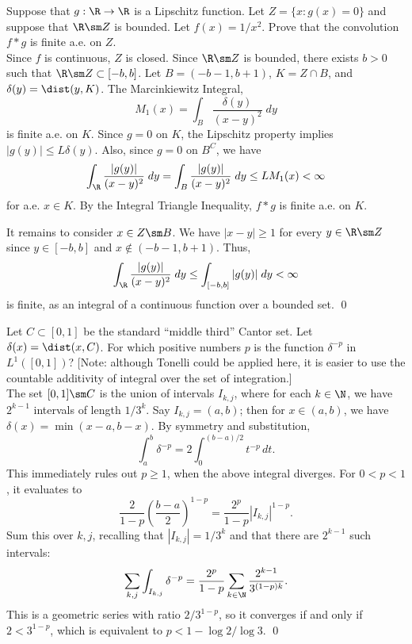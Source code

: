 \begin{hwsol}
Suppose that $g: \R \to \R$ is a Lipschitz function. Let $Z= \{ x \colon g(x)= 0 \}$ and suppose that $\R \sm Z$ is bounded. Let $f(x)=1/x^2$. Prove that the convolution $f*g$ is finite a.e. on $Z$. \\

\pf Since $f$ is continuous, $Z$ is closed. Since $\R \sm Z$ is bounded, there exists $b > 0$ such that $\R \sm Z \subset [-b, b]$. Let $B= (-b-1,b+1)$, $K= Z \cap B$, and $\delta(y)= \dist(y, K)$. The Marcinkiewitz Integral,
        \[
        M_1(x)= \int_B \dfrac{\delta(y)}{(x-y)^2} \;dy
        \]
is finite a.e. on $K$. Since $g=0$ on $K$, the Lipschitz property implies $|g(y)|\leq L\delta(y)$. Also, since $g=0$ on $B^C$, we have 
        \[
        \int_{\R} \dfrac{|g(y)|}{(x-y)^2} \;dy= \int_{B} \dfrac{|g(y)|}{(x-y)^2} \;dy \leq L M_1(x) < \infty
        \]
for a.e. $x \in K$. By the Integral Triangle Inequality, $f*g$ is finite a.e. on $K$. 

It remains to consider $x \in Z \sm B$. We have $|x - y| \geq 1$ for every $y \in \R \sm Z$ since $y \in [-b, b]$ and $x \notin (-b-1,b+1)$. Thus, 
        \[
        \int_{\R} \dfrac{|g(y)|}{(x-y)^2} \;dy \leq \int_{[-b, b]} |g(y)| \;dy < \infty
        \]
is finite, as an integral of a continuous function over a bounded set. \qed \\
\end{hwsol}


\begin{hwsol}
Let $C \subset [0, 1]$ be the standard ``middle third'' Cantor set. Let $\delta(x)= \dist(x,C)$. For which positive numbers $p$ is the function $\delta^{-p}$ in $L^1([0, 1])$? [Note: although Tonelli could be applied here, it is easier to use the countable additivity of integral over the set of integration.] \\

\pf The set $[0, 1] \sm C$ is the union of intervals $I_{k,j}$, where for each $k \in \N$, we have $2^{k-1}$ intervals of length $1/3^k$. Say $I_{k, j} = (a, b)$; then for $x \in (a, b)$, we have $\delta(x)= \min(x-a, b-x)$. By symmetry and substitution, 
        \[
        \int_{a}^b \delta^{-p} = 2 \int_0^{(b-a)/2} t^{-p}\,dt.
        \]
This immediately rules out $p \geq 1$, when the above integral diverges. For $0<p<1$, it evaluates to 
        \[
        \frac{2}{1-p} \left( \dfrac{b-a}{2} \right)^{1-p}= \dfrac{2^p}{1-p} |I_{k, j}|^{1-p}.
        \]
Sum this over $k, j$, recalling that $|I_{k, j}|= 1/3^k$ and that there are $2^{k-1}$ such intervals: 
        \[
        \sum_{k, j} \int_{I_{k,j}} \delta^{-p}= \frac{2^p}{1-p} \sum_{k\in\N} \frac{2^{k-1}}{3^{(1-p)k}}.
        \]
This is a geometric series with ratio $2/3^{1-p}$, so it converges if and only if $2 < 3^{1-p}$, which is equivalent to $p < 1 - \log 2/\log 3$. \qed \\
\end{hwsol}


